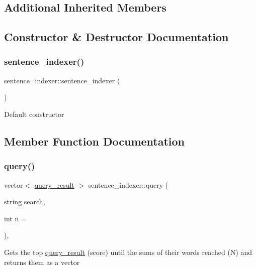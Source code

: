 \subsection*{Additional Inherited Members}


\subsection{Constructor \& Destructor Documentation}
\mbox{\label{classsentence__indexer_a365d5a760a116eb4f48fe8fdbdeb0421}} 
\subsubsection{\texorpdfstring{sentence\+\_\+indexer()}{sentence\_indexer()}}
{\footnotesize\ttfamily sentence\+\_\+indexer\+::sentence\+\_\+indexer (\begin{DoxyParamCaption}{ }\end{DoxyParamCaption})}

Default constructor 

\subsection{Member Function Documentation}
\mbox{\label{classsentence__indexer_a039940ff3461bb8fa95b66aa9b5f8496}} 
\subsubsection{\texorpdfstring{query()}{query()}}
{\footnotesize\ttfamily vector$<$ \hyperlink{classquery__result}{query\+\_\+result} $>$ sentence\+\_\+indexer\+::query (\begin{DoxyParamCaption}\item[{string}]{search,  }\item[{int}]{n = {} }\end{DoxyParamCaption})\hspace{0.3cm}{\ttfamily [override]}, {\ttfamily [virtual]}}

Gets the top \hyperlink{classquery__result}{query\+\_\+result} (score) until the sums of their words reached (N) and returns them as a vector 

